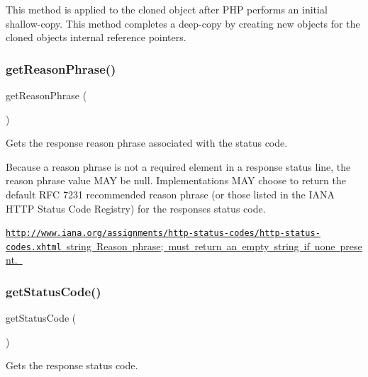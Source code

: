This method is applied to the cloned object after P\+HP performs an initial shallow-\/copy. This method completes a deep-\/copy by creating new objects for the cloned object\textquotesingle{}s internal reference pointers. \mbox{\label{class_pes_1_1_http_1_1_response_ad2574b5790012944a05218ed095d919d}} 
\subsubsection{\texorpdfstring{get\+Reason\+Phrase()}{getReasonPhrase()}}
{\footnotesize\ttfamily get\+Reason\+Phrase (\begin{DoxyParamCaption}{ }\end{DoxyParamCaption})}

Gets the response reason phrase associated with the status code.

Because a reason phrase is not a required element in a response status line, the reason phrase value M\+AY be null. Implementations M\+AY choose to return the default R\+FC 7231 recommended reason phrase (or those listed in the I\+A\+NA H\+T\+TP Status Code Registry) for the response\textquotesingle{}s status code.

\mbox{\hyperlink{}{\href{http://www.iana.org/assignments/http-status-codes/http-status-codes.xhtml}{\tt http\+://www.\+iana.\+org/assignments/http-\/status-\/codes/http-\/status-\/codes.\+xhtml}  string Reason phrase; must return an empty string if none present. }}\mbox{\label{class_pes_1_1_http_1_1_response_a094778dd1c04fe44626000b47ea0c0bb}} 
\subsubsection{\texorpdfstring{get\+Status\+Code()}{getStatusCode()}}
{\footnotesize\ttfamily get\+Status\+Code (\begin{DoxyParamCaption}{ }\end{DoxyParamCaption})}

Gets the response status code.

